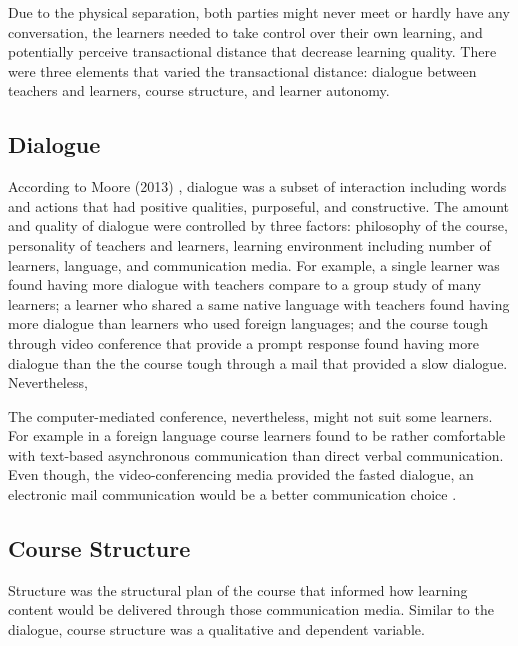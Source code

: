 Due to the physical separation, both parties might never meet or hardly have any conversation, the learners needed to take control over their own learning, and potentially perceive transactional distance that decrease learning quality. There were three elements that varied the transactional distance: dialogue between teachers and learners, course structure, and learner autonomy. 

\newpage 
\subsection {Dialogue} 

According to Moore (2013) \cite{moore2013handbook}, dialogue was a subset of interaction including words and actions that had positive qualities, purposeful, and constructive. The amount and quality of dialogue were controlled by three factors: philosophy of the course, personality of teachers and learners, learning environment including number of learners, language, and communication media. For example, a single learner was found having more dialogue with teachers compare to a group study of many learners; a learner who shared a same native language with teachers found having more dialogue than learners who used foreign languages; and the course tough through video conference that provide a prompt response found having more dialogue than the the course tough through a mail that provided a slow dialogue. Nevertheless, 


The computer-mediated conference, nevertheless, might not suit some learners. For example in a foreign language course learners found to be rather comfortable with text-based asynchronous communication than direct verbal communication. Even though, the video-conferencing media provided the fasted dialogue, an electronic mail communication would be a better communication choice \cite{moore2011distance}. 


\subsection {Course Structure} 

Structure was the structural plan of the course that informed how learning content would be delivered through those communication media. Similar to the dialogue, course structure was a qualitative and dependent variable.

